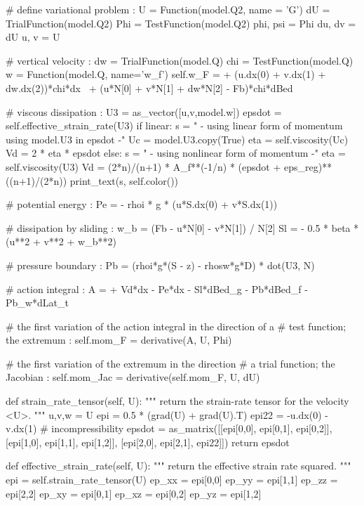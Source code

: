 \begin{python}[label=cslvr_reformulated_stokes, caption={\CSLVR source code contained in the \texttt{MomentumDukowiczStokesReduced} class.}]
# define variational problem :
U        = Function(model.Q2, name = 'G')
dU       = TrialFunction(model.Q2)
Phi      = TestFunction(model.Q2)
phi, psi = Phi
du,  dv  = dU
u,   v   = U

# vertical velocity :
dw       = TrialFunction(model.Q)
chi      = TestFunction(model.Q)
w        = Function(model.Q, name='w_f')
self.w_F = + (u.dx(0) + v.dx(1) + dw.dx(2))*chi*dx \
           + (u*N[0] + v*N[1] + dw*N[2] - Fb)*chi*dBed

# viscous dissipation :
U3       = as_vector([u,v,model.w])
epsdot   = self.effective_strain_rate(U3)
if linear:
  s      = "    - using linear form of momentum using model.U3 in epsdot -"
  Uc     = model.U3.copy(True)
  eta    = self.viscosity(Uc)
  Vd     = 2 * eta * epsdot
else:
  s      = "    - using nonlinear form of momentum -"
  eta    = self.viscosity(U3)
  Vd     = (2*n)/(n+1) * A_f**(-1/n) * (epsdot + eps_reg)**((n+1)/(2*n))
print_text(s, self.color())

# potential energy :
Pe       = - rhoi * g * (u*S.dx(0) + v*S.dx(1))

# dissipation by sliding :
w_b      = (Fb - u*N[0] - v*N[1]) / N[2]
Sl       = - 0.5 * beta * (u**2 + v**2 + w_b**2)

# pressure boundary :
Pb       = (rhoi*g*(S - z) - rhosw*g*D) * dot(U3, N)

# action integral :
A        = + Vd*dx - Pe*dx - Sl*dBed_g - Pb*dBed_f - Pb_w*dLat_t

# the first variation of the action integral in the direction of a 
# test function; the extremum :
self.mom_F = derivative(A, U, Phi)

# the first variation of the extremum in the direction 
# a trial function; the Jacobian :
self.mom_Jac = derivative(self.mom_F, U, dU)

def strain_rate_tensor(self, U):
  """
  return the strain-rate tensor for the velocity <U>.
  """
  u,v,w  = U
  epi    = 0.5 * (grad(U) + grad(U).T)
  epi22  = -u.dx(0) - v.dx(1)          # incompressibility
  epsdot = as_matrix([[epi[0,0],  epi[0,1],  epi[0,2]],
                      [epi[1,0],  epi[1,1],  epi[1,2]],
                      [epi[2,0],  epi[2,1],  epi22]])
  return epsdot

def effective_strain_rate(self, U):
  """
  return the effective strain rate squared.
  """
  epi    = self.strain_rate_tensor(U)
  ep_xx  = epi[0,0]
  ep_yy  = epi[1,1]
  ep_zz  = epi[2,2]
  ep_xy  = epi[0,1]
  ep_xz  = epi[0,2]
  ep_yz  = epi[1,2]
  

\end{python}
